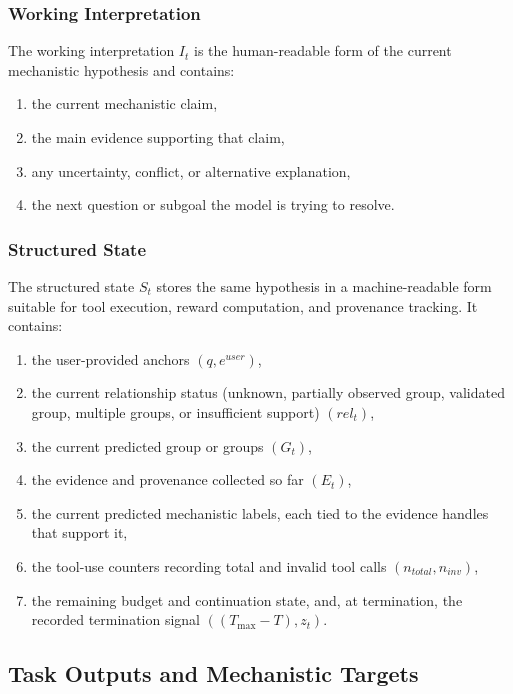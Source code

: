 \documentclass[thesis,letterpaper,12pt]{utthesis}
\begin{document}
\subsubsection{Working Interpretation}
The working interpretation $I_t$ is the human-readable form of the current mechanistic hypothesis and contains:
\begin{enumerate}
    \item the current mechanistic claim,
    \item the main evidence supporting that claim,
    \item any uncertainty, conflict, or alternative explanation,
    \item the next question or subgoal the model is trying to resolve.
\end{enumerate}

\subsubsection{Structured State}\label{sec:structured_state}
The structured state $S_t$ stores the same hypothesis in a machine-readable form suitable for tool execution, reward computation, and provenance tracking. It contains:
\begin{enumerate}
    \item the user-provided anchors $(q, e^{user})$,
    \item the current relationship status (unknown, partially observed group, validated group, multiple groups, or insufficient support) $(rel_t)$,
    \item the current predicted group or groups $(G_t)$,
    \item the evidence and provenance collected so far $(E_t)$,
    \item the current predicted mechanistic labels, each tied to the evidence handles that support it,
    \item the tool-use counters recording total and invalid tool calls $(n_{total}, n_{inv})$,
    \item the remaining budget and continuation state, and, at termination, the recorded termination signal $((T_{\max} - T), z_t)$.
\end{enumerate}

\subsection{Task Outputs and Mechanistic Targets}\label{sec:task}
\end{document}
